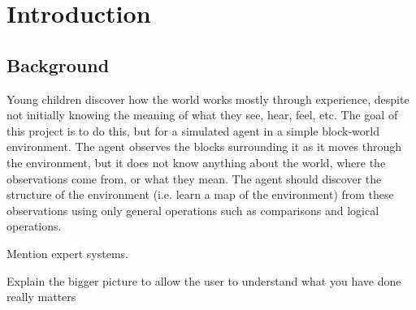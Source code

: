 \chapter{Introduction} \label{chapter:Intro}

% 

%
%
%
%

\section{Background}

Young children discover how the world works mostly through experience, despite not initially knowing the meaning of what they see, hear, feel, etc. The goal of this project is to do this, but for a simulated agent in a simple block‐world environment. The agent observes the blocks surrounding it as it moves through the environment, but it does not know anything about the world, where the observations come from, or what they mean. The agent should discover the structure of the environment (i.e. learn a map of the environment) from these observations using only general operations such as comparisons and logical operations.

Mention expert systems.

Explain the bigger picture to allow the user to understand what you have done really matters

